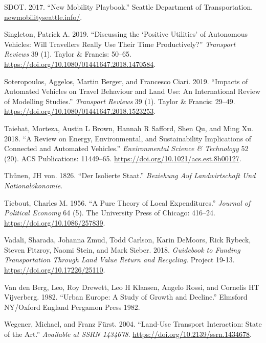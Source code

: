 \documentclass[12pt,]{article}
\begin{document}
\leavevmode\hypertarget{ref-SDOT2017mobility_Sea}{}%
SDOT. 2017. ``New Mobility Playbook.'' Seattle Department of
Transportation. \url{newmobilityseattle.info/}.

\leavevmode\hypertarget{ref-singleton2019discussing}{}%
Singleton, Patrick A. 2019. ``Discussing the `Positive Utilities' of
Autonomous Vehicles: Will Travellers Really Use Their Time
Productively?'' \emph{Transport Reviews} 39 (1). Taylor \& Francis:
50--65. \url{https://doi.org/10.1080/01441647.2018.1470584}.

\leavevmode\hypertarget{ref-soteropoulos2019impacts}{}%
Soteropoulos, Aggelos, Martin Berger, and Francesco Ciari. 2019.
``Impacts of Automated Vehicles on Travel Behaviour and Land Use: An
International Review of Modelling Studies.'' \emph{Transport Reviews} 39
(1). Taylor \& Francis: 29--49.
\url{https://doi.org/10.1080/01441647.2018.1523253}.

\leavevmode\hypertarget{ref-taiebat2018review}{}%
Taiebat, Morteza, Austin L Brown, Hannah R Safford, Shen Qu, and Ming
Xu. 2018. ``A Review on Energy, Environmental, and Sustainability
Implications of Connected and Automated Vehicles.'' \emph{Environmental
Science \& Technology} 52 (20). ACS Publications: 11449--65.
\url{https://doi.org/10.1021/acs.est.8b00127}.

\leavevmode\hypertarget{ref-thunen1826isolierte}{}%
Thünen, JH von. 1826. ``Der Isolierte Staat.'' \emph{Beziehung Auf
Landwirtschaft Und Nationalökonomie}.

\leavevmode\hypertarget{ref-tiebout1956pure}{}%
Tiebout, Charles M. 1956. ``A Pure Theory of Local Expenditures.''
\emph{Journal of Political Economy} 64 (5). The University Press of
Chicago: 416--24. \url{https://doi.org/10.1086/257839}.

\leavevmode\hypertarget{ref-vadali2018guidebook}{}%
Vadali, Sharada, Johanna Zmud, Todd Carlson, Karin DeMoors, Rick Rybeck,
Steven Fitzroy, Naomi Stein, and Mark Sieber. 2018. \emph{Guidebook to
Funding Transportation Through Land Value Return and Recycling}. Project
19-13. \url{https://doi.org/10.17226/25110}.

\leavevmode\hypertarget{ref-van1982urban}{}%
Van den Berg, Leo, Roy Drewett, Leo H Klaasen, Angelo Rossi, and
Cornelis HT Vijverberg. 1982. ``Urban Europe: A Study of Growth and
Decline.'' Elmsford NY/Oxford England Pergamon Press 1982.

\leavevmode\hypertarget{ref-wegener2004land}{}%
Wegener, Michael, and Franz Fürst. 2004. ``Land-Use Transport
Interaction: State of the Art.'' \emph{Available at SSRN 1434678}.
\url{https://doi.org/10.2139/ssrn.1434678}.
\end{document}
